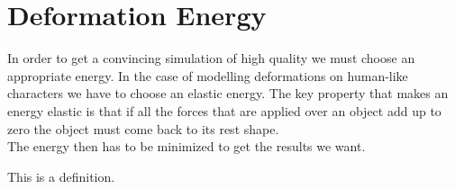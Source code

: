 \section{Deformation Energy}

In order to get a convincing simulation of high quality we must choose an appropriate energy. In the case of modelling deformations on human-like characters we have to choose an elastic energy. The key property that makes an energy elastic is that if all the forces that are applied over an object add up to zero the object must come back to its rest shape.
\\
The energy then has to be minimized to get the results we want.

\begin{definition}
  This is a definition.
\end{definition}



